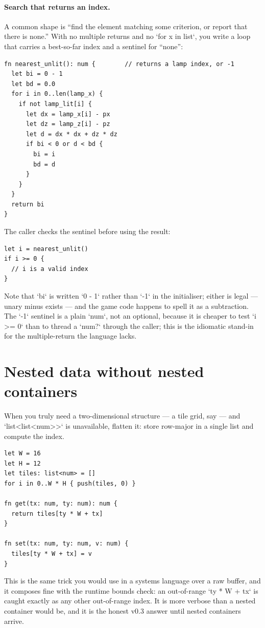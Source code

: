 \paragraph{Search that returns an index.} A common shape is ``find the element
matching some criterion, or report that there is none.'' With no multiple
returns and no `for x in list`, you write a loop that carries a best-so-far
index and a sentinel for ``none'':

\begin{lstlisting}[language=wick]
fn nearest_unlit(): num {        // returns a lamp index, or -1
  let bi = 0 - 1
  let bd = 0.0
  for i in 0..len(lamp_x) {
    if not lamp_lit[i] {
      let dx = lamp_x[i] - px
      let dz = lamp_z[i] - pz
      let d = dx * dx + dz * dz
      if bi < 0 or d < bd {
        bi = i
        bd = d
      }
    }
  }
  return bi
}
\end{lstlisting}

\noindent
The caller checks the sentinel before using the result:

\begin{lstlisting}[language=wick]
let i = nearest_unlit()
if i >= 0 {
  // i is a valid index
}
\end{lstlisting}

\noindent
Note that `bi` is written `0 - 1` rather than `-1` in the initialiser; either
is legal --- unary minus exists --- and the game code happens to spell it as a
subtraction. The `-1` sentinel is a plain `num`, not an optional, because it
is cheaper to test `i >= 0` than to thread a `num?` through the caller; this
is the idiomatic stand-in for the multiple-return the language lacks.

\section{Nested data without nested containers}

When you truly need a two-dimensional structure --- a tile grid, say --- and
`list<list<num>>` is unavailable, flatten it: store row-major in a single
list and compute the index.

\begin{lstlisting}[language=wick]
let W = 16
let H = 12
let tiles: list<num> = []
for i in 0..W * H { push(tiles, 0) }

fn get(tx: num, ty: num): num {
  return tiles[ty * W + tx]
}

fn set(tx: num, ty: num, v: num) {
  tiles[ty * W + tx] = v
}
\end{lstlisting}

\noindent
This is the same trick you would use in a systems language over a raw buffer,
and it composes fine with the runtime bounds check: an out-of-range
`ty * W + tx` is caught exactly as any other out-of-range index. It is more
verbose than a nested container would be, and it is the honest v0.3 answer
until nested containers arrive.
